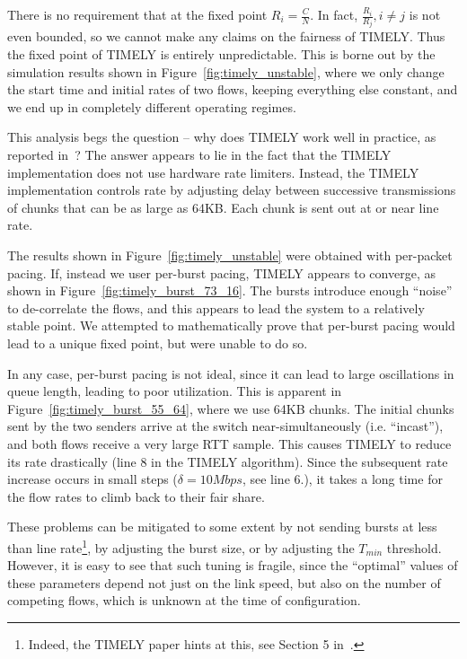 There is no requirement that at the fixed point $R_i = \tfrac{C}{N}$. In fact,
$\tfrac{R_{i}}{R_{j}}, i \ne j$ is not even bounded, so we cannot make any
claims on the fairness of TIMELY. Thus the fixed point of TIMELY is entirely
unpredictable. This is borne out by the simulation results shown in
Figure~\ref{fig:timely_unstable}, where we only change the start time and
initial rates of two flows, keeping everything else constant, and we end up in
completely different operating regimes.

This analysis begs the question -- why does TIMELY work well in practice, as
reported in~\cite{timely}? The answer appears to lie in the fact that the TIMELY
implementation does not use hardware rate limiters.  Instead, the TIMELY
implementation controls rate by adjusting delay between successive transmissions
of chunks that can be as large as 64KB. Each chunk is sent out at or near line rate.

The results shown in Figure~\ref{fig:timely_unstable} were obtained with
per-packet pacing. If, instead we user per-burst pacing, TIMELY appears to
converge, as shown in Figure~\ref{fig:timely_burst_73_16}. The bursts introduce
enough ``noise'' to de-correlate the flows, and this appears to lead the system
to a relatively stable point. We attempted to mathematically prove that
per-burst pacing would lead to a unique fixed point, but were unable to do so.

In any case, per-burst pacing is not ideal, since it can lead to large
oscillations in queue length, leading to poor utilization. This is apparent in
Figure~\ref{fig:timely_burst_55_64}, where we use 64KB chunks. The initial chunks sent by the
two senders arrive at the switch near-simultaneously (i.e. ``incast''), and both
flows receive a very large RTT sample. This causes TIMELY to reduce its rate
drastically (line 8 in the TIMELY algorithm). Since the subsequent rate increase
occurs in small steps ($\delta = 10Mbps$, see line 6.), it takes a long time for
the flow rates to climb back to their fair share. 

These problems can be mitigated to some extent by not sending bursts at less
than line rate\footnote{Indeed, the TIMELY paper hints at this, see Section 5
in~\cite{timely}.}, by adjusting the burst size, or by adjusting the $T_{min}$
threshold. However, it is easy to see that such tuning is fragile, since the
``optimal'' values of these parameters depend not just on the link speed, but
also on the number of competing flows, which is unknown at the time of
configuration.

